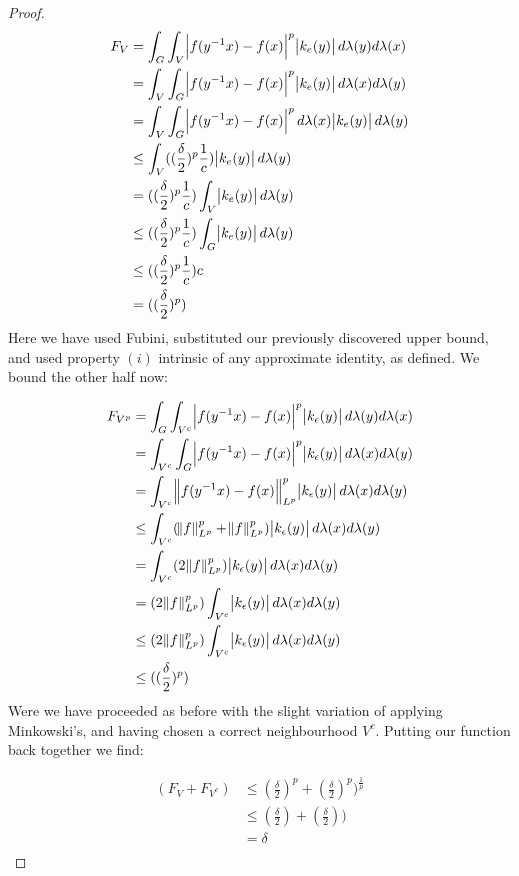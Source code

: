 \begin{proof}
\begin{align*}
F_V &= \int_G \int_V \abs{f(y^{-1}x)-f(x)}^p \abs{k_e(y)} d\lambda(y) d\lambda(x)\\
&= \int_V \int_G \abs{f(y^{-1}x)-f(x)}^p \abs{k_e(y)} d\lambda(x) d\lambda(y)\\
&= \int_V \int_G \abs{f(y^{-1}x)-f(x)}^p  d\lambda(x) \abs{k_e(y)} d\lambda(y)\\
&\leq \int_V ( (\frac{\delta}{2})^p \frac{1}{c} ) \abs{k_e(y)} d\lambda(y)\\
&= ( (\frac{\delta}{2})^p \frac{1}{c} ) \int_V  \abs{k_e(y)} d\lambda(y)\\
&\leq ( (\frac{\delta}{2})^p \frac{1}{c} ) \int_G  \abs{k_e(y)} d\lambda(y)\\
&\leq ( (\frac{\delta}{2})^p \frac{1}{c} ) c\\
&= ( (\frac{\delta}{2})^p )\\
\end{align*}
Here we have used Fubini, substituted our previously discovered upper bound, and used property $(i)$ intrinsic of any approximate identity, as defined. We bound the other half now:

\begin{align*}
F_{V^p} &= \int_G \int_{V^c} \abs{f(y^{-1}x)-f(x)}^p \abs{k_\epsilon(y)} d\lambda(y) d\lambda(x) \\
&= \int_{V^c} \int_{G} \abs{f(y^{-1}x)-f(x)}^p \abs{k_\epsilon(y)} d\lambda(x) d\lambda(y) \\
&= \int_{V^c} \norm{f(y^{-1}x)-f(x)}^p_{L^p} \abs{k_\epsilon(y)} d\lambda(x) d\lambda(y) \\
&\leq \int_{V^c} (\norm{f}^p_{L^p}+\norm{f}^p_{L^p}) \abs{k_\epsilon(y)} d\lambda(x) d\lambda(y) \\
&= \int_{V^c} (2\norm{f}^p_{L^p}) \abs{k_\epsilon(y)} d\lambda(x) d\lambda(y) \\
&= (2\norm{f}^p_{L^p}) \int_{V^c} \abs{k_\epsilon(y)} d\lambda(x) d\lambda(y) \\
&\leq (2\norm{f}^p_{L^p}) \int_{V^c} \abs{k_\epsilon(y)} d\lambda(x) d\lambda(y) \\
&\leq ( (\frac{\delta}{2})^p )
\end{align*}
Were we have proceeded as before with the slight variation of applying Minkowski's, and having chosen a correct neighbourhood $V^c$. Putting our function back together we find:

\begin{align*}
(F_V + F_{V^c}) &\leq (\frac{\delta}{2})^p + (\frac{\delta}{2})^p ) ^{\frac{1}{p}}\\
&\leq (\frac{\delta}{2})+(\frac{\delta}{2}))\\
&= \delta\\
\end{align*}


\end{proof}
